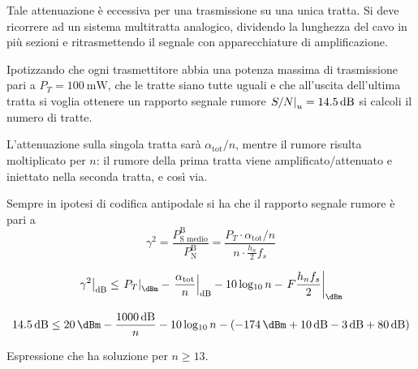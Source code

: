 Tale attenuazione è eccessiva per una trasmissione su una unica tratta. Si deve ricorrere ad un sistema multitratta analogico, dividendo la lunghezza del cavo in più sezioni e ritrasmettendo il segnale con apparecchiature di amplificazione.

Ipotizzando che ogni trasmettitore abbia una potenza massima di trasmissione pari a $P_T=\SI{100}{\milli\watt}$, che le tratte siano tutte uguali e che all'uscita dell'ultima tratta si voglia ottenere un rapporto segnale rumore $\restrict{S/N}{u}=\SI{14.5}{\decibel}$ si calcoli il numero di tratte.

L'attenuazione sulla singola tratta sarà $\alpha_\text{tot}/n$, mentre il rumore risulta moltiplicato per $n$: il rumore della prima tratta viene amplificato/attenuato e iniettato nella seconda tratta, e così via.

Sempre in ipotesi di codifica antipodale si ha che il rapporto segnale rumore è pari a 
\[\gamma^2=\frac{P_\text{S medio}^\text{B}}{P_\text{N}^\text{B}}=\frac{P_T\cdot\alpha_\text{tot}/n}{n\cdot\frac{h_n}{2}f_s}\]

\[\restrict{\gamma^2}{\si{\decibel}}\leq \restrict{P_T}{\si{\dBm}} - \restrict{\frac{\alpha_\text{tot}}{n}}{\si{\decibel}}-10\Log{n}-\restrict{F\frac{h_n f_s}{2}}{\si{\dBm}}\]

\[ \SI{14.5}{\decibel}\leq\SI{20}{\dBm} - \frac{\SI{1000}{\decibel}}{n}-10\Log{n}-(-\SI{174}{\dBm}+\SI{10}{\decibel}-\SI{3}{\decibel}+\SI{80}{\decibel})\]

Espressione che ha soluzione per $n\geq 13$.

\begin{figure}[ht!]\centering
{}\quad%
\end{figure}

